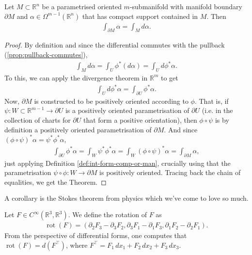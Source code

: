 \begin{theorem}\label{thm:stokes}
	Let $M \subset \mathbb{R}^{n}$ be a parametrised oriented $m$-submanifold with manifold boundary $\partial M$ and $\alpha \in \Omega^{m-1}(\mathbb{R}^{n})$ that has compact support contained in $M$. Then
	\begin{align*}
		\int_{\partial M} \alpha = \int_{M} d\alpha.
	\end{align*}
\end{theorem}
\begin{proof}
	By definition and since the differential commutes with the pullback (\ref{prop:pullback-commutes}),
	\begin{align*}
		\int_{M} d\alpha = \int_{U} \phi^*(d\alpha) = \int_{U} d \phi^*\alpha .
	\end{align*}
	To this, we can apply the divergence theorem in $\mathbb{R}^{m}$ to get
	\begin{align*}
		\int_{U} d \phi^*\alpha  = \int_{\partial U} \phi^*\alpha .
	\end{align*}
	Now, $\partial M$ is constructed to be positively oriented according to $\phi$. That is, if $\psi: W \subset \mathbb{R}^{m-1} \to \partial U$ is a positively oriented parametrisation of $\partial U$ (i.e. in the collection of charts for $\partial U$ that form a positive orientation), then $\phi \circ \psi$ is by definition a positively oriented parametrisation of $\partial M$. And since $(\phi \circ \psi)^* \alpha = \psi^* \phi^*\alpha$,
	\begin{align*}
		\int_{\partial U} \phi^*\alpha = \int_{W} \psi^* \phi^* \alpha = \int_{W} (\phi \circ \psi)^*\alpha = \int_{\partial M} \alpha,
	\end{align*}
	just applying Definition \ref{def:int-form-comp-or-man}, crucially using that the parametrisation $\psi \circ \phi: W \to \partial M$ is positively oriented.
	Tracing back the chain of equalities, we get the Theorem.
\end{proof}

A corollary is the Stokes theorem from physics which we've come to love so much.

\begin{definition}\label{def:rot-3}
	Let $F \in C^{\infty}(\mathbb{R}^{3}, \mathbb{R}^{3})$. We define the rotation of $F$ as
	\begin{align*}
		\operatorname{rot} (F) = (\partial_{2}F_{3} - \partial_{3}F_{2}, \partial_{3}F_{1} - \partial_{1} F_{3}, \partial_{1} F_{2} - \partial_{2} F_{1}).
	\end{align*}
	From the perspective of differential forms, one computes that $\operatorname{rot} (F) = d(F^\top )$, where $F^\top = F_{1}\, dx_{1} + F_{2} \, dx_{2} + F_{3} \, dx_{3}$.
\end{definition}

